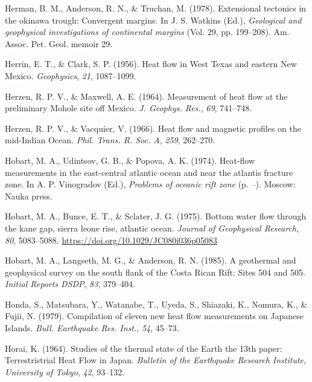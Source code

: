 \documentclass[draft,linenumbers]{agujournal2018}
\begin{document}
\leavevmode{}%
Herman, B. M., Anderson, R. N., \& Truchan, M. (1978). Extensional
tectonics in the okinawa trough: Convergent margins. In J. S. Watkins
(Ed.), \emph{Geological and geophysical investigations of continental
margins} (Vol. 29, pp. 199--208). Am. Assoc. Pet. Geol. memoir 29.

\leavevmode{}%
Herrin, E. T., \& Clark, S. P. (1956). Heat flow in {West Texas and
eastern New Mexico}. \emph{Geophysics}, \emph{21}, 1087--1099.

\leavevmode{}%
Herzen, R. P. V., \& Maxwell, A. E. (1964). Measurement of heat flow at
the preliminary {Mohole} site off {Mexico}. \emph{J. Geophys. Res.},
\emph{69}, 741--748.

\leavevmode{}%
Herzen, R. P. V., \& Vacquier, V. (1966). Heat flow and magnetic
profiles on the {mid-Indian Ocean}. \emph{Phil. Trans. R. Soc. A},
\emph{259}, 262--270.

\leavevmode{}%
Hobart, M. A., Udintsov, G. B., \& Popova, A. K. (1974). Heat-flow
measurements in the east-central atlantic ocean and near the atlantis
fracture zone. In A. P. Vinogradov (Ed.), \emph{Problems of oceanic rift
zone} (p. --). Moscow: Nauka press.

\leavevmode{}%
Hobart, M. A., Bunce, E. T., \& Sclater, J. G. (1975). Bottom water flow
through the kane gap, sierra leone rise, atlantic ocean. \emph{Journal
of Geophysical Research}, \emph{80}, 5083--5088.
\url{https://doi.org/10.1029/JC080i036p05083}

\leavevmode{}%
Hobart, M. A., Langseth, M. G., \& Anderson, R. N. (1985). A geothermal
and geophysical survey on the south flank of the {Costa Rican Rift}:
Sites 504 and 505. \emph{Initial Reports DSDP}, \emph{83}, 379--404.

\leavevmode{}%
Honda, S., Matsubara, Y., Watanabe, T., Uyeda, S., Shiazaki, K., Nomura,
K., \& Fujii, N. (1979). Compilation of eleven new heat flow
measurements on {Japanese Islands}. \emph{Bull. Earthquake Res. Inst.},
\emph{54}, 45--73.

\leavevmode{}%
Horai, K. (1964). Studies of the thermal state of the {Earth} the 13th
paper: {Terrestristrial Heat Flow in Japan}. \emph{Bulletin of the
Earthquake Research Institute, University of Tokyo}, \emph{42}, 93--132.
\end{document}
